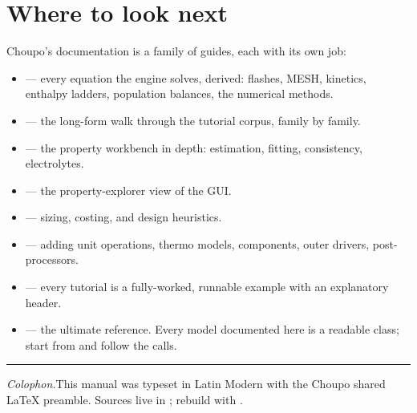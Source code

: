 \documentclass[11pt,a4paper]{article}
\begin{document}
\section{Where to look next}

Choupo's documentation is a family of guides, each with its own job:

\begin{itemize}[leftmargin=*]
  \item {} --- every equation the engine
        solves, derived: flashes, MESH, kinetics, enthalpy ladders,
        population balances, the numerical methods.
  \item {} --- the long-form walk through
        the tutorial corpus, family by family.
  \item {} --- the property workbench in depth:
        estimation, fitting, consistency, electrolytes.
  \item {} --- the property-explorer view of
        the GUI.
  \item {} --- sizing, costing, and design
        heuristics.
  \item {} --- adding unit operations,
        thermo models, components, outer drivers, post-processors.
  \item {} --- every tutorial
        is a fully-worked, runnable example with an explanatory header.
  \item {} --- the ultimate reference.  Every model documented
        here is a readable \cpp{} class; start from
         and
        follow the calls.
\end{itemize}

\vspace{2cm}
\noindent\rule{\linewidth}{0.3pt}
\noindent\small\textit{Colophon.}\quad This manual was typeset in Latin
Modern with the Choupo shared LaTeX preamble.  Sources live in
; rebuild with .
\end{document}
